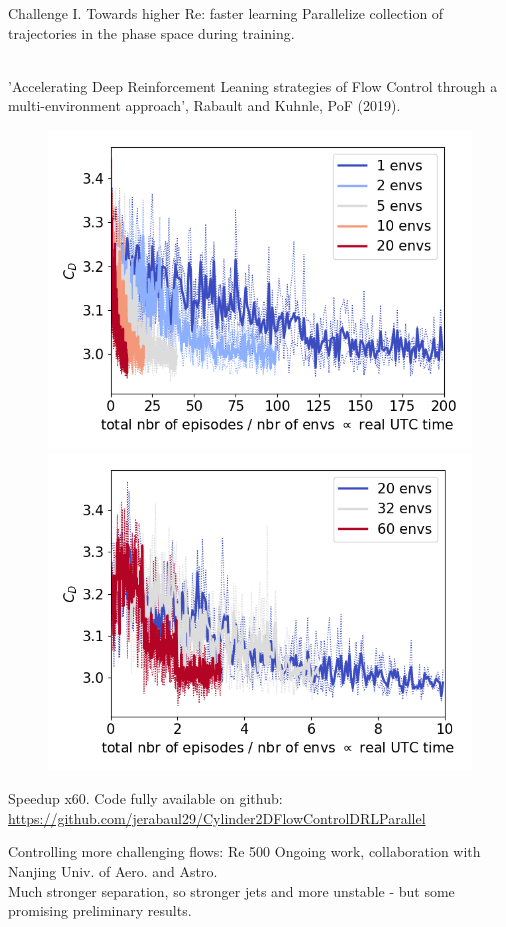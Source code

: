 \documentclass{beamer}
\begin{document}
\begin{frame}{Challenge I. Towards higher Re: faster learning}
    Parallelize collection of trajectories in the phase space during training. \\~

    'Accelerating Deep Reinforcement Leaning strategies of Flow Control through a multi-environment approach', Rabault and Kuhnle, PoF (2019). \\

    \begin{figure}
    \begin{center}
      \includegraphics[width=.49\textwidth]{Figures/fig_real_time_under}
      \includegraphics[width=.49\textwidth]{Figures/fig_real_time_over}
    \end{center}
    \end{figure}

    Speedup x60. Code fully available on github: \\
    {\small \url{https://github.com/jerabaul29/Cylinder2DFlowControlDRLParallel}}
    
\end{frame}


\begin{frame}{Controlling more challenging flows: Re 500}
    Ongoing work, collaboration with Nanjing Univ. of Aero. and Astro. \\

    Much stronger separation, so stronger jets and more unstable - but some promising preliminary results.

    \begin{center}
\end{center}
\end{frame}
\end{document}
